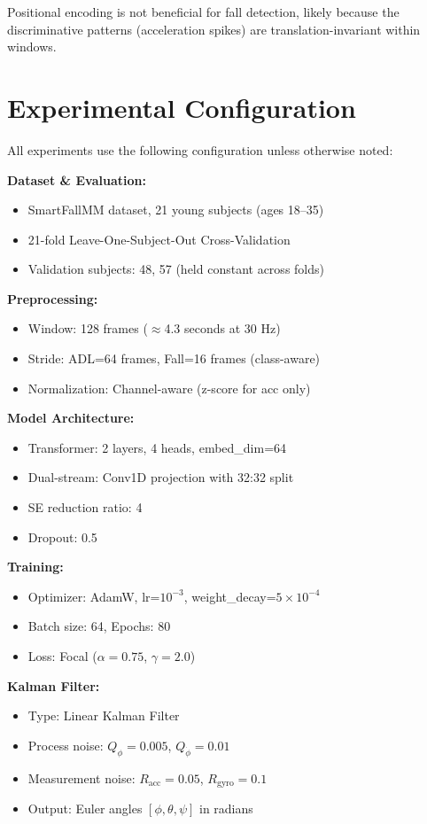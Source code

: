 Positional encoding is not beneficial for fall detection, likely because the discriminative patterns (acceleration spikes) are translation-invariant within windows.

\section{Experimental Configuration}
\label{app:config}

All experiments use the following configuration unless otherwise noted:

\textbf{Dataset \& Evaluation:}
\begin{itemize}
    \item SmartFallMM dataset, 21 young subjects (ages 18--35)
    \item 21-fold Leave-One-Subject-Out Cross-Validation
    \item Validation subjects: 48, 57 (held constant across folds)
\end{itemize}

\textbf{Preprocessing:}
\begin{itemize}
    \item Window: 128 frames ($\approx$4.3 seconds at 30 Hz)
    \item Stride: ADL=64 frames, Fall=16 frames (class-aware)
    \item Normalization: Channel-aware (z-score for acc only)
\end{itemize}

\textbf{Model Architecture:}
\begin{itemize}
    \item Transformer: 2 layers, 4 heads, embed\_dim=64
    \item Dual-stream: Conv1D projection with 32:32 split
    \item SE reduction ratio: 4
    \item Dropout: 0.5
\end{itemize}

\textbf{Training:}
\begin{itemize}
    \item Optimizer: AdamW, lr=$10^{-3}$, weight\_decay=$5\times10^{-4}$
    \item Batch size: 64, Epochs: 80
    \item Loss: Focal ($\alpha=0.75$, $\gamma=2.0$)
\end{itemize}

\textbf{Kalman Filter:}
\begin{itemize}
    \item Type: Linear Kalman Filter
    \item Process noise: $Q_\phi=0.005$, $Q_{\dot\phi}=0.01$
    \item Measurement noise: $R_\text{acc}=0.05$, $R_\text{gyro}=0.1$
    \item Output: Euler angles $[\phi, \theta, \psi]$ in radians
\end{itemize}

